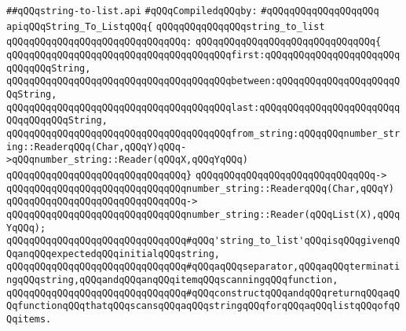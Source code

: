\label{src/lib/src/string-to-list.api}
\verb|##qQQqstring-to-list.api|\newline
\newline
\verb|#qQQqCompiledqQQqby:|\newline
\verb|#qQQqqQQqqQQqqQQqqQQq|\newline
\newline
\newline
\newline
\newline
\newline
\verb|apiqQQqString_To_ListqQQq{|\newline
\newline
\verb|qQQqqQQqqQQqqQQqstring_to_list|\newline
\verb|qQQqqQQqqQQqqQQqqQQqqQQqqQQqqQQq:|\newline
\verb|qQQqqQQqqQQqqQQqqQQqqQQqqQQqqQQq{|\newline
\verb|qQQqqQQqqQQqqQQqqQQqqQQqqQQqqQQqqQQqqQQqfirst:qQQqqQQqqQQqqQQqqQQqqQQqqQQqqQQqString,|\newline
\verb|qQQqqQQqqQQqqQQqqQQqqQQqqQQqqQQqqQQqqQQqbetween:qQQqqQQqqQQqqQQqqQQqqQQqString,|\newline
\verb|qQQqqQQqqQQqqQQqqQQqqQQqqQQqqQQqqQQqqQQqlast:qQQqqQQqqQQqqQQqqQQqqQQqqQQqqQQqqQQqString,|\newline
\verb|qQQqqQQqqQQqqQQqqQQqqQQqqQQqqQQqqQQqqQQqfrom_string:qQQqqQQqnumber_string::ReaderqQQq(Char,qQQqY)qQQq->qQQqnumber_string::Reader(qQQqX,qQQqYqQQq)|\newline
\verb|qQQqqQQqqQQqqQQqqQQqqQQqqQQqqQQq}|\newline
\verb|qQQqqQQqqQQqqQQqqQQqqQQqqQQqqQQq->|\newline
\verb|qQQqqQQqqQQqqQQqqQQqqQQqqQQqqQQqnumber_string::ReaderqQQq(Char,qQQqY)|\newline
\verb|qQQqqQQqqQQqqQQqqQQqqQQqqQQqqQQq->|\newline
\verb|qQQqqQQqqQQqqQQqqQQqqQQqqQQqqQQqnumber_string::Reader(qQQqList(X),qQQqYqQQq);|\newline
\newline
\verb|qQQqqQQqqQQqqQQqqQQqqQQqqQQqqQQq#qQQq'string_to_list'qQQqisqQQqgivenqQQqanqQQqexpectedqQQqinitialqQQqstring,|\newline
\verb|qQQqqQQqqQQqqQQqqQQqqQQqqQQqqQQq#qQQqaqQQqseparator,qQQqaqQQqterminatingqQQqstring,qQQqandqQQqanqQQqitemqQQqscanningqQQqfunction,|\newline
\verb|qQQqqQQqqQQqqQQqqQQqqQQqqQQqqQQq#qQQqconstructqQQqandqQQqreturnqQQqaqQQqfunctionqQQqthatqQQqscansqQQqaqQQqstringqQQqforqQQqaqQQqlistqQQqofqQQqitems.|\newline
